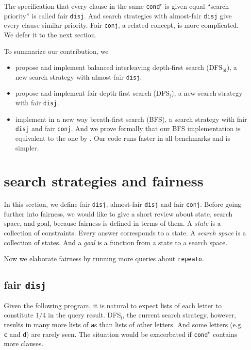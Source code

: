 \documentclass[format=acmlarge, review=true, authordraft=true]{acmart}
\newcommand{\conde}{\texttt{cond$^e$}}
\newcommand{\conj}{\texttt{conj}}
\newcommand{\disj}{\texttt{disj}}
\newcommand{\DFSi }[0]{DFS$_\textrm{i}$}
\newcommand{\DFSf }[0]{DFS$_\textrm{f}$}
\newcommand{\DFSbi}[0]{DFS$_\textrm{bi}$}
\begin{document}
The specification that every clause in the same \conde{} is given equal 
``search priority'' is called fair \disj{}. And search strategies with 
almost-fair \disj{} give every clause similar priority. 
Fair \conj{}, a related concept, is more complicated. We defer it to the next 
section.

To summarize our contribution, we
\begin{itemize}
	\item propose and implement balanced interleaving depth-first search 
	(\DFSbi{}), a new search strategy with almost-fair \disj{}.
	\item propose and implement fair depth-first search (\DFSf{}), a 
	new search strategy with fair \disj{}.
	\item implement in a new way breath-first search (BFS), a search strategy 
	with fair \disj{} and fair \conj{}. And we prove formally that our BFS 
implementation is equivalent to the one by \citet{seres1999algebra}. Our code 
runs faster in all benchmarks and is simpler. 
\end{itemize}

\section{search strategies and fairness}

In this section, we define fair \disj{}, almost-fair \disj{} and fair \conj{}. 
Before going further into fairness, we would like to give a short review about 
state, search space, and goal, because fairness is defined in terms of them. 
A \emph{state} is a collection of constraints. Every answer corresponds to a 
state. A \emph{search space} is a collection of states. And a \emph{goal} is a 
function from a state to a search space. 


Now we elaborate fairness by running more queries about \texttt{repeato}.

\subsection{fair \texttt{disj}}

Given the following program, it is natural to expect lists of each letter to
constitute $1/4$ in the query result. \DFSi, the current search
strategy, however, results in many more lists of \texttt{a}s than lists
of other letters. And some letters  (e.g. \texttt{c} and \texttt{d}) are
rarely seen. The situation would be exacerbated if \conde{} contains more 
clauses.
\end{document}

